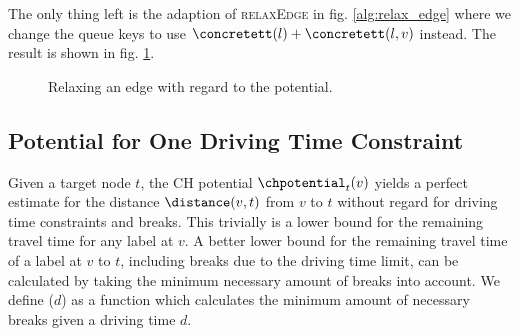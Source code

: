 The only thing left is the adaption of \textsc{relaxEdge} in fig. \ref{alg:relax_edge} where we change the queue keys to use $\concretett(l) + \concretett(l,v)$ instead. The result is shown in fig. \ref{alg:relax_edge_a_star}.

\begin{figure}[hbtp]
	\setlength{\interspacetitleruled}{0pt}%
	\setlength{\algotitleheightrule}{0pt}%
	\begin{algorithm*}[H]
		\DontPrintSemicolon



	\end{algorithm*}
	\setlength{\interspacetitleruled}{2pt}%
	\setlength{\algotitleheightrule}{\algotitleheightruledefault}%

	\caption{\label{alg:relax_edge_a_star} Relaxing an edge with regard to the potential.}
\end{figure}

\subsection{Potential for One Driving Time Constraint}\label{section:potential_csp}
Given a target node $t$, the CH potential $\chpotential_t(v)$ yields a perfect estimate for the distance $\distance(v,t)$ from $v$ to $t$ without regard for driving time constraints and breaks. This trivially is a lower bound for the remaining travel time for any label at $v$. A better lower bound for the remaining travel time of a label at $v$ to $t$, including breaks due to the driving time limit, can be calculated by taking the minimum necessary amount of breaks into account. We define \minBreaks($d$) as a function which calculates the minimum amount of necessary breaks given a driving time $d$.

